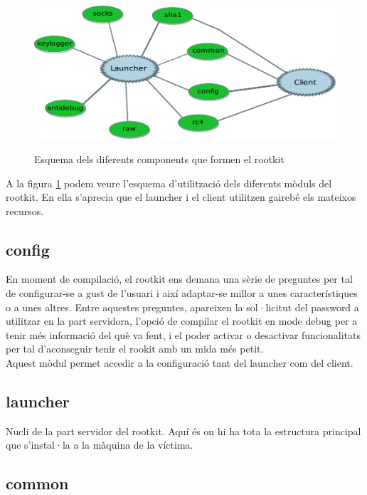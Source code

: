 \begin{figure}[htp]
    \centering
        \includegraphics[scale=0.7,keepaspectratio]{diagrames/solutionDesignModules.pdf} \\
    \caption{Esquema dels diferents components que formen el rootkit}
    \label{fig:rootkitModules}
\end{figure}

A la figura \ref{fig:rootkitModules} podem veure l'esquema d'utilització dels diferents mòduls 
del rootkit. En ella s'aprecia que el launcher i el client utilitzen gairebé els mateixos recursos.\\
\subsection{config}

En moment de compilació, el rootkit ens demana una sèrie de preguntes per tal de configurar-se a gust
de l'usuari i així adaptar-se millor a unes característiques o a unes altres. Entre aquestes
preguntes, apareixen la sol·licitut del password a utilitzar en la part servidora, l'opció de compilar
el rootkit en mode debug per a tenir més informació del què va fent, i el poder activar o desactivar
funcionalitats per tal d'aconseguir tenir el rookit amb un mida més petit. \\ 

Aquest mòdul permet accedir a la configuració tant del launcher com del client.

\subsection{launcher}

Nucli de la part servidor del rootkit. Aquí és on hi ha tota la estructura principal
que s'instal·la a la màquina de la víctima.

\subsection{common}

